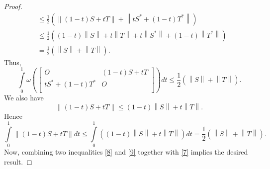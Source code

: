 \documentclass[10pt,a4paper]{amsart}
\begin{document}
\begin{proof}
\[\begin{aligned}
 & \le \frac{1}{2}\left( \left\| \left( 1-t \right)S+tT \right\|+\left\| t{{S}^{*}}+\left( 1-t \right){{T}^{*}} \right\| \right) \\ 
 & \le \frac{1}{2}\left( \left( 1-t \right)\left\| S \right\|+t\left\| T \right\|+t\left\| {{S}^{*}} \right\|+\left( 1-t \right)\left\| {{T}^{*}} \right\| \right) \\ 
 & =\frac{1}{2}\left( \left\| S \right\|+\left\| T \right\| \right).  
\end{aligned}\]
Thus,
\begin{equation}\label{8}
\int\limits_{0}^{1}{\omega \left( \left[ \begin{matrix}
   O & \left( 1-t \right)S+tT  \\
   t{{S}^{*}}+\left( 1-t \right){{T}^{*}} & O  \\
\end{matrix} \right] \right)dt}\le \frac{1}{2}\left( \left\| S \right\|+\left\| T \right\| \right).
\end{equation}
We also have
\[\left\| \left( 1-t \right)S+tT \right\|\le \left( 1-t \right)\left\| S \right\|+t\left\| T \right\|.\]
Hence
\begin{equation}\label{9}
\int\limits_{0}^{1}{\left\| \left( 1-t \right)S+tT \right\|dt}\le \int\limits_{0}^{1}{\left( \left( 1-t \right)\left\| S \right\|+t\left\| T \right\| \right)dt}=\frac{1}{2}\left( \left\| S \right\|+\left\| T \right\| \right).
\end{equation}
Now, combining two inequalities \eqref{8} and \eqref{9} together with \eqref{7} implies the desired result.
\end{proof}
\end{document}
